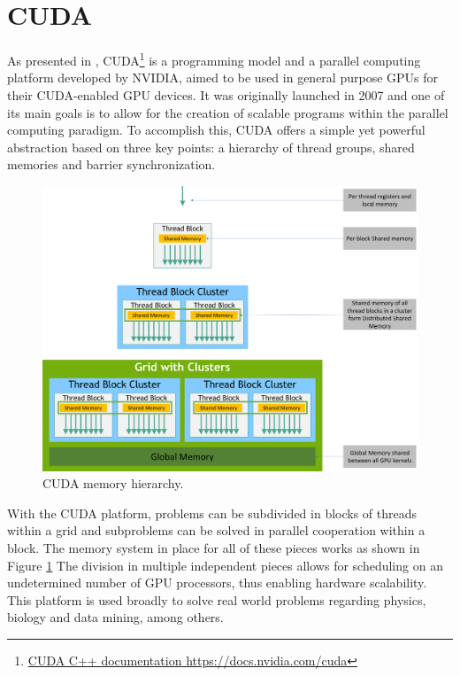 

\section{CUDA}

As presented in \cite{Liang:2011:GridCuda}, CUDA\footnote{\href{https://docs.nvidia.com/cuda}{{CUDA C++ documentation} \url{https://docs.nvidia.com/cuda}}} is a programming model and a parallel computing platform developed by NVIDIA, aimed to be used in general purpose GPUs for their CUDA-enabled GPU devices.
It was originally launched in 2007 and one of its main goals is to allow for the creation of scalable programs within the parallel computing paradigm.
To accomplish this, CUDA offers a simple yet powerful abstraction based on three key points: a hierarchy of thread groups, shared memories and barrier synchronization.

\begin{figure}[H]
	\centering
	\includegraphics[width=\linewidth]{images/cuda-memory-hierarchy.png}
	\caption{CUDA memory hierarchy.}
	\label{fig:cuda-memory-hierarchy}
\end{figure}

With the CUDA platform, problems can be subdivided in blocks of threads within a grid and subproblems can be solved in parallel cooperation within a block.
The memory system in place for all of these pieces works as shown in Figure \ref{fig:cuda-memory-hierarchy}
The division in multiple independent pieces allows for scheduling on an undetermined number of GPU processors, thus enabling hardware scalability.
This platform is used broadly to solve real world problems regarding physics, biology and data mining, among others.

